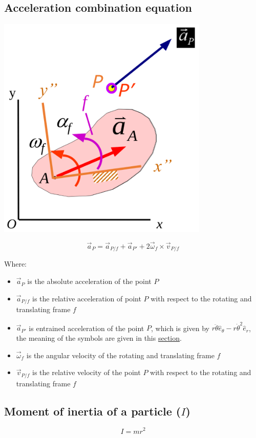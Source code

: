 \documentclass[11pt]{article}
\begin{document}
\subsection{Acceleration combination equation}
\label{sec:org7ccd33c}
\begin{center}
\includegraphics[height=29em]{./images/acceleration-combination-equation-diagram.png}
\end{center}

\[\vec{a}_P = \vec{a}_{P/f} + \vec{a}_{P'} + 2 \vec{\omega}_f \times \vec{v}_{P/f}\]

Where:
\begin{itemize}
\item \(\vec{a}_P\) is the absolute acceleration of the point \(P\)
\item \(\vec{a}_{P/f}\) is the relative acceleration of point \(P\) with respect to the rotating and translating frame \(f\)
\item \(\vec{a}_{P'}\) is entrained acceleration of the point \(P\), which is given by \(r \ddot{\theta} \hat{e}_{\theta} - r \dot{\theta}^2 \hat{e}_r\), the meaning of the symbols are given in this \hyperref[org4f8ac63]{section}.
\item \(\vec{\omega}_f\) is the angular velocity of the rotating and translating frame \(f\)
\item \(\vec{v}_{P/f}\) is the relative velocity of the point \(P\) with respect to the rotating and translating frame \(f\)
\end{itemize}

\subsection{Moment of inertia of a particle (\(I\))}
\label{sec:org8253f28}
\[I = mr^2\]
\end{document}
